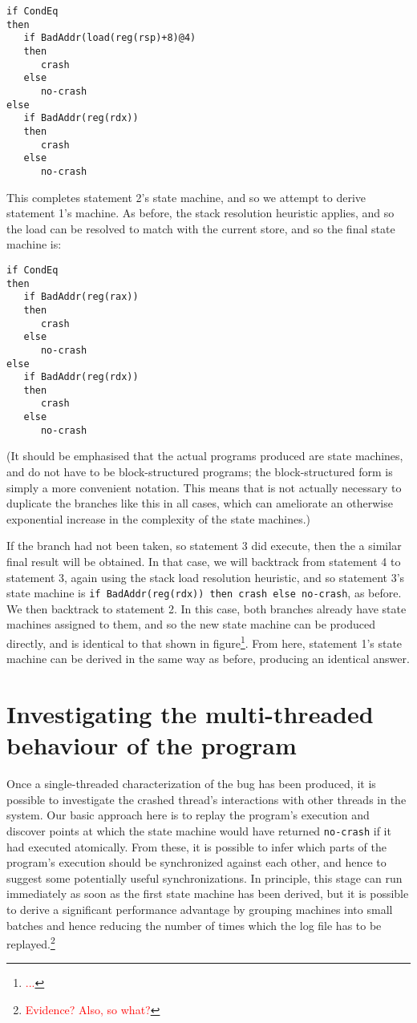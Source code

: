 \documentclass[10pt,twocolumn,preprint,natbib,authoryear]{sigplanconf}
\newcommand{\editorial}[1]{\textcolor{red}{\footnote{\textcolor{red}{#1}}}}
\begin{document}
\begin{verbatim}
if CondEq
then
   if BadAddr(load(reg(rsp)+8)@4)
   then
      crash
   else
      no-crash
else
   if BadAddr(reg(rdx))
   then
      crash
   else
      no-crash
\end{verbatim}

This completes statement 2's state machine, and so we attempt to
derive statement 1's machine.  As before, the stack resolution
heuristic applies, and so the load can be resolved to match with
the current store, and so the final state machine is:

\begin{verbatim}
if CondEq
then
   if BadAddr(reg(rax))
   then
      crash
   else
      no-crash
else
   if BadAddr(reg(rdx))
   then
      crash
   else
      no-crash
\end{verbatim}

(It should be emphasised that the actual programs produced are state
machines, and do not have to be block-structured programs; the
block-structured form is simply a more convenient notation.  This
means that is not actually necessary to duplicate the branches like
this in all cases, which can ameliorate an otherwise exponential
increase in the complexity of the state machines.)

If the branch had not been taken, so statement 3 did execute, then the
a similar final result will be obtained.  In that case, we will
backtrack from statement 4 to statement 3, again using the stack load
resolution heuristic, and so statement 3's state machine is
\verb|if BadAddr(reg(rdx)) then crash else no-crash|, as before.  We
then backtrack to statement 2.  In this case, both branches already
have state machines assigned to them, and so the new state machine can
be produced directly, and is identical to that shown in
figure\editorial{...}.  From here, statement 1's state machine can be
derived in the same way as before, producing an identical answer.

\section{Investigating the multi-threaded behaviour of the program}

Once a single-threaded characterization of the bug has been produced,
it is possible to investigate the crashed thread's interactions with
other threads in the system.  Our basic approach here is to replay the
program's execution and discover points at which the state machine
would have returned \verb|no-crash| if it had executed atomically.
From these, it is possible to infer which parts of the program's
execution should be synchronized against each other, and hence to
suggest some potentially useful synchronizations.  In principle, this
stage can run immediately as soon as the first state machine has been
derived, but it is possible to derive a significant performance
advantage by grouping machines into small batches and hence reducing
the number of times which the log file has to be
replayed.\editorial{Evidence?  Also, so what?}
\end{document}
